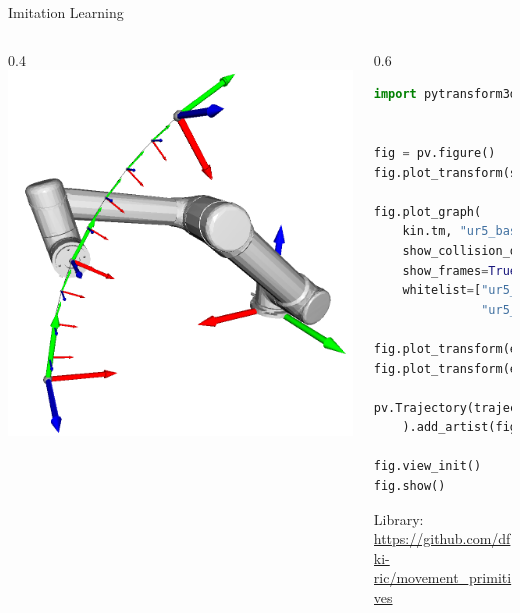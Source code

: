\documentclass[14pt]{beamer}
\begin{document}
\begin{frame}[fragile]{Imitation Learning}
\begin{columns}
\begin{column}{0.4\textwidth}
\includegraphics[width=\textwidth]{images/movement_primitives_cart_dmp_ur5}
\end{column}
\begin{column}{0.6\textwidth}
\begin{lstlisting}[language=Python]
import pytransform3d.visualizer as pv


fig = pv.figure()
fig.plot_transform(s=0.3)

fig.plot_graph(
    kin.tm, "ur5_base_link",
    show_collision_objects=True,
    show_frames=True, s=0.1,
    whitelist=["ur5_base_link",
               "ur5_tool0"])

fig.plot_transform(ee2base_start)
fig.plot_transform(ee2base_end)

pv.Trajectory(trajectory
    ).add_artist(fig)

fig.view_init()
fig.show()
\end{lstlisting}
{\tiny Library: \url{https://github.com/dfki-ric/movement_primitives}}
\end{column}
\end{columns}
\end{frame}
\end{document}
